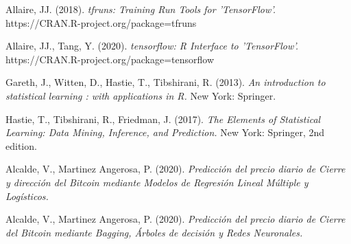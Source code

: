 \documentclass[a4paper,12pt,twocolumn]{article}
\begin{document}
\begin{thebibliography}{99}
Allaire, JJ. (2018).
{\em tfruns: Training Run Tools for 'TensorFlow'.}
https://CRAN.R-project.org/package=tfruns

Allaire, JJ., Tang, Y. (2020).
{\em tensorflow: R Interface to 'TensorFlow'.}
https://CRAN.R-project.org/package=tensorflow

Gareth, J., Witten, D., Hastie, T., Tibshirani, R. (2013). 
{\em An introduction to statistical learning : with applications in R.}
New York: Springer.

Hastie, T., Tibshirani, R., Friedman, J. (2017). 
{\em The Elements of Statistical Learning: Data Mining, Inference, and Prediction.}
New York: Springer, 2nd edition.

Alcalde, V., Martinez Angerosa, P. (2020). 
{\em Predicción del precio diario de Cierre y dirección del Bitcoin mediante Modelos de Regresión Lineal Múltiple y Logísticos.}

Alcalde, V., Martinez Angerosa, P. (2020). 
{\em Predicción del precio diario de Cierre del
Bitcoin mediante Bagging, Árboles de
decisión y Redes Neuronales.}

\end{thebibliography}
\end{document}
